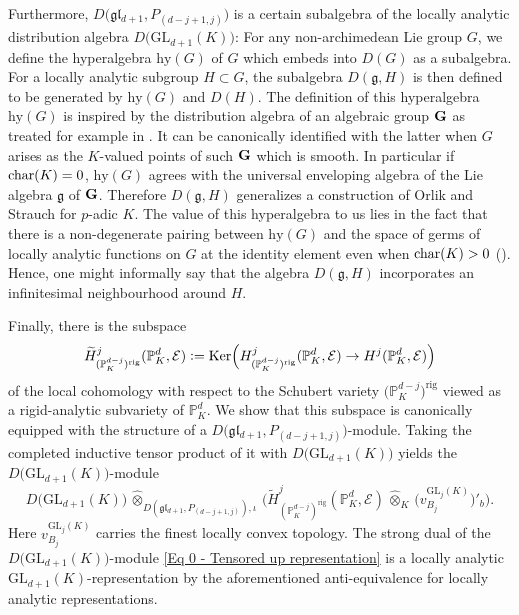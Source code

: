 \documentclass[a4paper, reqno, 10pt]{amsart}
\theoremstyle{definition}
\numberwithin{equation}{section}
\newcommand{\cotimes}[1]{{\,\widehat{\otimes}_{#1}\,}}
\newcommand{\defeq}{\vcentcolon=}
\newcommand{\GL}{{\mathrm{GL}}}
\newcommand{\hy}{{\mathrm{hy}}}
\newcommand{\Ker}{{\mathrm{Ker}}}
\newcommand{\ra}{\rightarrow}
\newcommand{\rig}{{\mathrm{rig}}}
\newcommand{\BP}{{\mathbb {P}}}
\newcommand{\CE}{{\mathcal {E}}}
\newcommand{\bG}{{\mathrm{\bf G}}}
\newcommand{\Fg}{{\mathfrak {g}}}
\newcommand{\Fl}{{\mathfrak {l}}}
\begin{document}
Furthermore, $D\big(\Fg\Fl_{d+1},P_{(d-j+1,j)}\big)$ is a certain subalgebra of the locally analytic distribution algebra $D\big(\GL_{d+1}(K)\big)$:
For any non-archimedean Lie group $G$, we define the hyperalgebra $\hy(G)$ of $G$ which embeds into $D(G)$ as a subalgebra.
For a locally analytic subgroup $H \subset G$, the subalgebra $D(\Fg, H)$ is then defined to be generated by $\hy(G)$ and $D(H)$. 
The definition of this hyperalgebra $\hy(G)$ is inspired by the distribution algebra of an algebraic group $\bG$ as treated for example in \cite{Jantzen03RepAlgGrp}.
It can be canonically identified with the latter when $G$ arises as the $K$-valued points of such $\bG$ which is smooth.
In particular if ${\rm char}(K)=0$, $\hy(G)$ agrees with the universal enveloping algebra of the Lie algebra $\Fg$ of $\bG$.
Therefore $D(\Fg, H)$ generalizes a construction of Orlik and Strauch \cite[\S 3.4]{OrlikStrauch15JordanHoelderSerLocAnRep} for $p$-adic $K$.
The value of this hyperalgebra to us lies in the fact that there is a non-degenerate pairing between $\hy(G)$ and the space of germs of locally analytic functions on $G$ at the identity element even when ${\rm char}(K)>0$ ().
Hence, one might informally say that the algebra $D(\Fg, H)$ incorporates an infinitesimal neighbourhood around $H$.


Finally, there is the subspace
\begin{equation*}
	\widetilde{H}^{j}_{(\BP_K^{d-j})^\rig} (\BP_K^d, \CE) \defeq \Ker \Big( H^{j}_{(\BP_K^{d-j})^\rig} (\BP_K^d, \CE) \ra H^j (\BP_K^d, \CE) \Big)
\end{equation*}
of the local cohomology with respect to the Schubert variety $\big(\BP_K^{d-j}\big)^\rig $ viewed as a rigid-analytic subvariety of $\BP_K^d$.
We show that this subspace is canonically equipped with the structure of a $D\big(\Fg\Fl_{d+1}, P_{(d-j+1,j)}\big)$-module.
Taking the completed inductive tensor product of it with $D\big(\GL_{d+1}(K) \big)$ yields the $D\big(\GL_{d+1}(K) \big)$-module
\begin{equation}\label{Eq 0 - Tensored up representation}
	D\big(\GL_{d+1}(K) \big) \cotimes{D(\Fg\Fl_{d+1},P_{(d-j+1,j)}), \iota} \Big( \widetilde{H}^{j}_{(\BP_K^{d-j})^\rig} (\BP_K^d, \CE) \cotimes{K} \big( v^{\GL_{j}(K)}_{B_{j}} \big)'_b \Big) . \tag{$*$}
\end{equation}
Here $v^{\GL_{j}(K)}_{B_{j}}$ carries the finest locally convex topology.
The strong dual of the $D\big(\GL_{d+1}(K)\big)$-module \eqref{Eq 0 - Tensored up representation} is a locally analytic $\GL_{d+1}(K)$-representation by the aforementioned anti-equi\-va\-lence for locally analytic representations.
\end{document}
